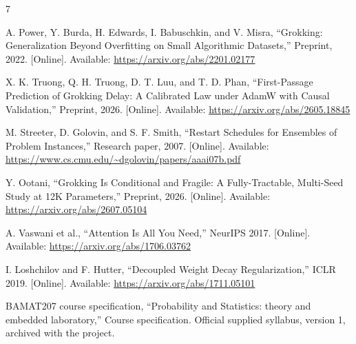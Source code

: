 \documentclass[conference,letterpaper]{IEEEtran}
\begin{document}
\begin{thebibliography}{7}

 A. Power, Y. Burda, H. Edwards, I. Babuschkin, and V. Misra, ``Grokking: Generalization Beyond Overfitting on Small Algorithmic Datasets,'' Preprint, 2022. [Online]. Available: \url{https://arxiv.org/abs/2201.02177}

 X. K. Truong, Q. H. Truong, D. T. Luu, and T. D. Phan, ``First-Passage Prediction of Grokking Delay: A Calibrated Law under AdamW with Causal Validation,'' Preprint, 2026. [Online]. Available: \url{https://arxiv.org/abs/2605.18845}

 M. Streeter, D. Golovin, and S. F. Smith, ``Restart Schedules for Ensembles of Problem Instances,'' Research paper, 2007. [Online]. Available: \url{https://www.cs.cmu.edu/~dgolovin/papers/aaai07b.pdf}

 Y. Ootani, ``Grokking Is Conditional and Fragile: A Fully-Tractable, Multi-Seed Study at 12K Parameters,'' Preprint, 2026. [Online]. Available: \url{https://arxiv.org/abs/2607.05104}

 A. Vaswani et al., ``Attention Is All You Need,'' NeurIPS 2017. [Online]. Available: \url{https://arxiv.org/abs/1706.03762}

 I. Loshchilov and F. Hutter, ``Decoupled Weight Decay Regularization,'' ICLR 2019. [Online]. Available: \url{https://arxiv.org/abs/1711.05101}

 BAMAT207 course specification, ``Probability and Statistics: theory and embedded laboratory,'' Course specification. Official supplied syllabus, version 1, archived with the project.

\end{thebibliography}
\end{document}
